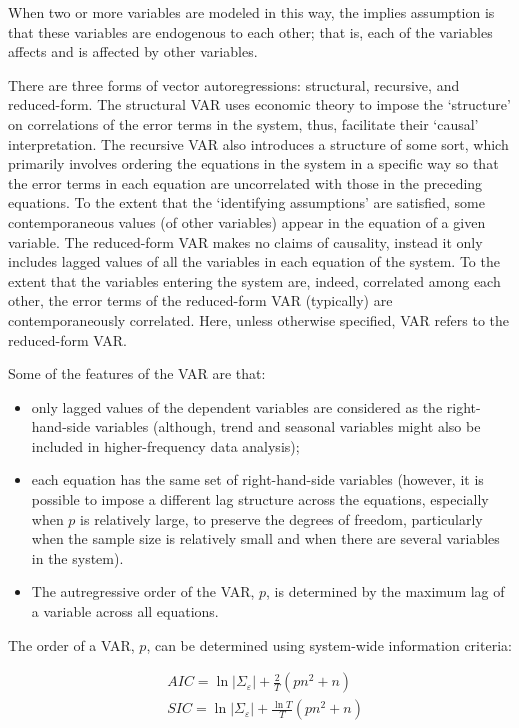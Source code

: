 \documentclass[
  oneside]{book}
\providecommand{\tightlist}{%
  \setlength{\itemsep}{0pt}\setlength{\parskip}{0pt}}
\begin{document}
When two or more variables are modeled in this way, the implies assumption is that these variables are endogenous to each other; that is, each of the variables affects and is affected by other variables.

There are three forms of vector autoregressions: structural, recursive, and reduced-form. The structural VAR uses economic theory to impose the `structure' on correlations of the error terms in the system, thus, facilitate their `causal' interpretation. The recursive VAR also introduces a structure of some sort, which primarily involves ordering the equations in the system in a specific way so that the error terms in each equation are uncorrelated with those in the preceding equations. To the extent that the `identifying assumptions' are satisfied, some contemporaneous values (of other variables) appear in the equation of a given variable. The reduced-form VAR makes no claims of causality, instead it only includes lagged values of all the variables in each equation of the system. To the extent that the variables entering the system are, indeed, correlated among each other, the error terms of the reduced-form VAR (typically) are contemporaneously correlated. Here, unless otherwise specified, VAR refers to the reduced-form VAR.

Some of the features of the VAR are that:

\begin{itemize}
\tightlist
\item
  only lagged values of the dependent variables are considered as the right-hand-side variables (although, trend and seasonal variables might also be included in higher-frequency data analysis);
\item
  each equation has the same set of right-hand-side variables (however, it is possible to impose a different lag structure across the equations, especially when \(p\) is relatively large, to preserve the degrees of freedom, particularly when the sample size is relatively small and when there are several variables in the system).
\item
  The autregressive order of the VAR, \(p\), is determined by the maximum lag of a variable across all equations.
\end{itemize}

The order of a VAR, \(p\), can be determined using system-wide information criteria:

\[\begin{aligned}
& AIC = \ln\left|\Sigma_{\varepsilon}\right| + \frac{2}{T}(pn^2+n) \\
& SIC = \ln\left|\Sigma_{\varepsilon}\right| + \frac{\ln{T}}{T}(pn^2+n)
\end{aligned}\]
\end{document}
